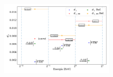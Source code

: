     \begin{figure}[H]
        \begin{small}
            \begin{center}
                \includegraphics[width=0.5\textwidth]{d_perp_no_normalizado.pdf}
            \end{center}
            \caption{}
            \label{fig:}
        \end{small}
    \end{figure}
    



    
    
    
    
